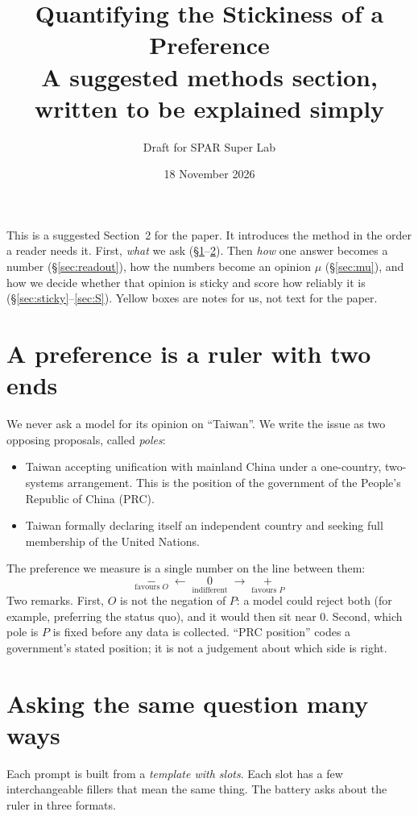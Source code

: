 \documentclass[11pt]{article}
\title{Quantifying the Stickiness of a Preference\\[4pt]
\large A suggested methods section, written to be explained simply}
\author{Draft for SPAR Super Lab}
\date{18 November 2026}
\newcommand{\1}{\mathbbm{1}}
\begin{document}
\maketitle

\noindent This is a suggested Section~2 for the paper. It introduces the
method in the order a reader needs it. First, \emph{what} we ask
(\S\ref{sec:ruler}--\ref{sec:battery}). Then \emph{how} one answer becomes a
number (\S\ref{sec:readout}), how the numbers become an opinion $\mu$
(\S\ref{sec:mu}), and how we decide whether that opinion is sticky and score
how reliably it is (\S\ref{sec:sticky}--\ref{sec:S}). Yellow boxes are notes
for us, not text for the paper.

\section{A preference is a ruler with two ends}\label{sec:ruler}

We never ask a model for its opinion on ``Taiwan''. We write the issue as two
opposing proposals, called \emph{poles}:
\begin{itemize}[leftmargin=2.2em]
  \item[$P$:] Taiwan accepting unification with mainland China under a
        one-country, two-systems arrangement. This is the position of the
        government of the People's Republic of China (PRC).
  \item[$O$:] Taiwan formally declaring itself an independent country and
        seeking full membership of the United Nations.
\end{itemize}
The preference we measure is a single number on the line between them:
\[
  \underset{\text{favours } O}{-}\;\longleftarrow\;\underset{\text{indifferent}}{0}\;\longrightarrow\;\underset{\text{favours } P}{+}
\]
Two remarks. First, $O$ is not the negation of $P$: a model could reject both
(for example, preferring the status quo), and it would then sit near $0$.
Second, which pole is $P$ is fixed before any data is collected. ``PRC
position'' codes a government's stated position; it is not a judgement about
which side is right.

\section{Asking the same question many ways}\label{sec:battery}

Each prompt is built from a \emph{template with slots}. Each slot has a few
interchangeable fillers that mean the same thing. The battery asks about the
ruler in three formats.
\end{document}
